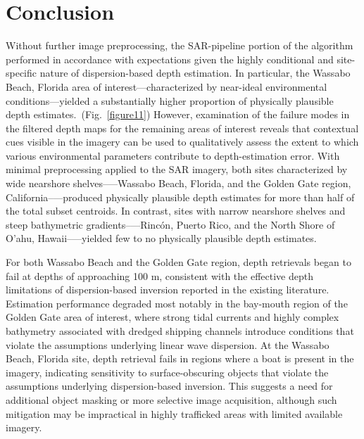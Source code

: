 \documentclass[12pt]{article}
\begin{document}
\section{Conclusion}

Without further image preprocessing, the SAR-pipeline portion of the algorithm performed in accordance with expectations given the highly conditional and site-specific nature of dispersion-based depth estimation. In particular, the Wassabo Beach, Florida area of interest—characterized by near-ideal environmental conditions—yielded a substantially higher proportion of physically plausible depth estimates.~(Fig.~\ref{figure11}) However, examination of the failure modes in the filtered depth maps for the remaining areas of interest reveals that contextual cues visible in the imagery can be used to qualitatively assess the extent to which various environmental parameters contribute to depth-estimation error. With minimal preprocessing applied to the SAR imagery, both sites characterized by wide nearshore shelves--—Wassabo Beach, Florida, and the Golden Gate region, California--—produced physically plausible depth estimates for more than half of the total subset centroids. In contrast, sites with narrow nearshore shelves and steep bathymetric gradients--—Rincón, Puerto Rico, and the North Shore of O'ahu, Hawaii--—yielded few to no physically plausible depth estimates. 

For both Wassabo Beach and the Golden Gate region, depth retrievals began to fail at depths of approaching 100 m, consistent with the effective depth limitations of dispersion-based inversion reported in the existing literature. Estimation performance degraded most notably in the bay-mouth region of the Golden Gate area of interest, where strong tidal currents and highly complex bathymetry associated with dredged shipping channels introduce conditions that violate the assumptions underlying linear wave dispersion. At the Wassabo Beach, Florida site, depth retrieval fails in regions where a boat is present in the imagery, indicating sensitivity to surface-obscuring objects that violate the assumptions underlying dispersion-based inversion. This suggests a need for additional object masking or more selective image acquisition, although such mitigation may be impractical in highly trafficked areas with limited available imagery.
\end{document}
